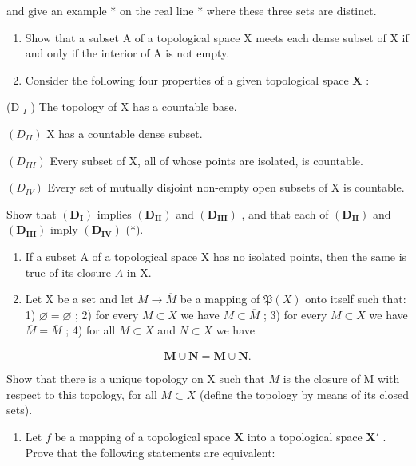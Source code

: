and give an example * on the real line * where these three sets are distinct.

\begin{enumerate}
\def\labelenumi{\arabic{enumi})}
\setcounter{enumi}{5}
\item
  Show that a subset A of a topological space X meets each dense subset of X if and only if the interior of A is not empty.
\item
  Consider the following four properties of a given topological space \(\mathbf{X}\) :
\end{enumerate}

(D \(_{I}\) ) The topology of X has a countable base.

\((D_{II})\) X has a countable dense subset.

\((D_{III})\) Every subset of X, all of whose points are isolated, is countable.

\((D_{IV})\) Every set of mutually disjoint non-empty open subsets of X is countable.

Show that \((\mathbf{D}_{\mathbf{I}})\) implies \((\mathbf{D}_{\mathbf{II}})\) and \((\mathbf{D}_{\mathbf{III}})\) , and that each of \((\mathbf{D}_{\mathbf{II}})\) and \((\mathbf{D}_{\mathbf{III}})\) imply \((\mathbf{D}_{\mathbf{IV}})\) (*).

\begin{enumerate}
\def\labelenumi{\arabic{enumi})}
\setcounter{enumi}{7}
\item
  If a subset A of a topological space X has no isolated points, then the same is true of its closure \(\overline{A}\) in X.
\item
  Let X be a set and let \(M \to \overline{M}\) be a mapping of \(\mathfrak{P}(X)\) onto itself such that: 1) \(\overline{\varnothing} = \varnothing\) ; 2) for every \(M \subset X\) we have \(M \subset \overline{M}\) ; 3) for every \(M \subset X\) we have \(\overline{M} = \overline{M}\) ; 4) for all \(M \subset X\) and \(N \subset X\) we have
\end{enumerate}

\[
\overline {{\mathbf {M} \cup \mathbf {N}}} = \overline {{\mathbf {M}}} \cup \overline {{\mathbf {N}}}.
\]

Show that there is a unique topology on X such that \(\overline{M}\) is the closure of M with respect to this topology, for all \(M \subset X\) (define the topology by means of its closed sets).

\BourbakiExerciseGroup

\begin{enumerate}
\def\labelenumi{\arabic{enumi})}
\tightlist
\item
  Let \(f\) be a mapping of a topological space \(\mathbf{X}\) into a topological space \(\mathbf{X}'\) . Prove that the following statements are equivalent:
\end{enumerate}

